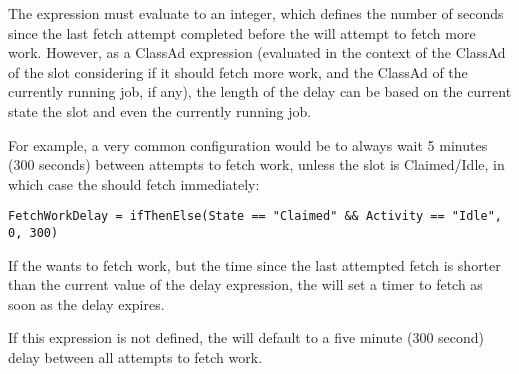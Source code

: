 The  expression must evaluate to an integer,
which defines the number of seconds since the last fetch attempt
completed before the  will attempt to fetch more work.
However, as a ClassAd expression (evaluated in the context of the
ClassAd of the slot considering if it should fetch more work, and the
ClassAd of the currently running job, if any), the length of the delay
can be based on the current state the slot and even the currently
running job.

For example, a very common configuration would be to always wait 5
minutes (300 seconds) between attempts to fetch work, unless the slot
is Claimed/Idle, in which case the  should fetch
immediately:

\footnotesize
\begin{verbatim}
FetchWorkDelay = ifThenElse(State == "Claimed" && Activity == "Idle", 0, 300) 
\end{verbatim}
\normalsize

If the  wants to fetch work, but the time since the
last attempted fetch is shorter than the current value of the delay
expression, the  will set a timer to fetch as soon as
the delay expires.

If this expression is not defined, the  will default to
a five minute (300 second) delay between all attempts to fetch work.

